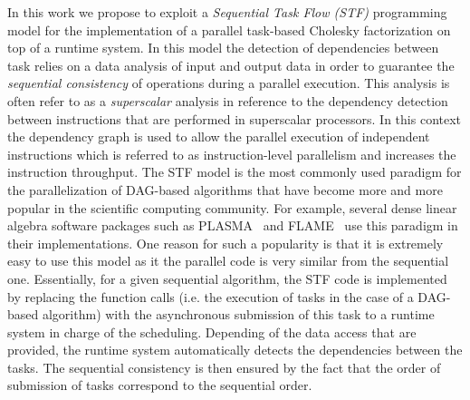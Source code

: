 \documentclass{article}
\begin{document}
In this work we propose to exploit a \textit{Sequential Task Flow
  (STF)} programming model for the implementation of a parallel
task-based Cholesky factorization on top of a runtime system. In this
model the detection of dependencies between task relies on a data
analysis of input and output data in order to guarantee the
\textit{sequential consistency} of operations during a parallel
execution. This analysis is often refer to as a \textit{superscalar}
analysis in reference to the dependency detection between instructions
that are performed in superscalar processors. In this context the
dependency graph is used to allow the parallel execution of
independent instructions which is referred to as instruction-level
parallelism and increases the instruction throughput. The STF model is
the most commonly used paradigm for the parallelization of DAG-based
algorithms that have become more and more popular in the scientific
computing community. For example, several dense linear algebra
software packages such as PLASMA~\cite{a.d.d.h.ea:09} and
FLAME~\cite{i.c.q.q.ea:12} use this paradigm in their
implementations. One reason for such a popularity is that it is
extremely easy to use this model as it the parallel code is very
similar from the sequential one. Essentially, for a given sequential
algorithm, the STF code is implemented by replacing the function calls
(i.e. the execution of tasks in the case of a DAG-based algorithm)
with the asynchronous submission of this task to a runtime system in
charge of the scheduling. Depending of the data access that are
provided, the runtime system automatically detects the dependencies
between the tasks. The sequential consistency is then ensured by the
fact that the order of submission of tasks correspond to the
sequential order.
\end{document}
